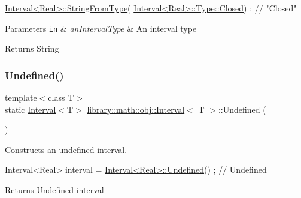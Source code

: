\begin{DoxyCode}
\hyperlink{classlibrary_1_1math_1_1obj_1_1_interval_a64a1850152db9b95c9824c71378d9f40}{Interval<Real>::StringFromType}(
      \hyperlink{classlibrary_1_1math_1_1obj_1_1_interval_abc7177f1c446d8273e70c989953667d1a03f4a47830f97377a35321051685071e}{Interval<Real>::Type::Closed}) ; \textcolor{comment}{// "Closed"}
\end{DoxyCode}



\begin{DoxyParams}[1]{Parameters}
\mbox{\tt in}  & {\em an\+Interval\+Type} & An interval type \\
\hline
\end{DoxyParams}
\begin{DoxyReturn}{Returns}
String 
\end{DoxyReturn}
\mbox{\label{classlibrary_1_1math_1_1obj_1_1_interval_a415849a8c5306d6811612a842a5d0a40}} 
\subsubsection{\texorpdfstring{Undefined()}{Undefined()}}
{\footnotesize\ttfamily template$<$class T$>$ \\
static \hyperlink{classlibrary_1_1math_1_1obj_1_1_interval}{Interval}$<$T$>$ \hyperlink{classlibrary_1_1math_1_1obj_1_1_interval}{library\+::math\+::obj\+::\+Interval}$<$ T $>$\+::Undefined (\begin{DoxyParamCaption}{ }\end{DoxyParamCaption})\hspace{0.3cm}{\ttfamily [static]}}



Constructs an undefined interval. 


\begin{DoxyCode}
Interval<Real> interval = \hyperlink{classlibrary_1_1math_1_1obj_1_1_interval_a415849a8c5306d6811612a842a5d0a40}{Interval<Real>::Undefined}() ; \textcolor{comment}{// Undefined}
\end{DoxyCode}


\begin{DoxyReturn}{Returns}
Undefined interval 
\end{DoxyReturn}



